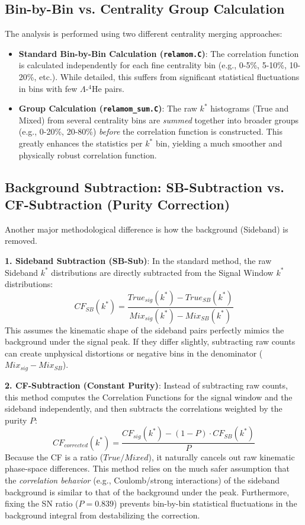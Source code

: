 \documentclass[11pt,a4paper]{article}
\begin{document}
\subsection{Bin-by-Bin vs. Centrality Group Calculation}
The analysis is performed using two different centrality merging approaches:
\begin{itemize}
    \item \textbf{Standard Bin-by-Bin Calculation (\texttt{relamom.C})}: The correlation function is calculated independently for each fine centrality bin (e.g., 0-5\%, 5-10\%, 10-20\%, etc.). While detailed, this suffers from significant statistical fluctuations in bins with few $\Lambda$-$^{4}\mathrm{He}$ pairs.
    \item \textbf{Group Calculation (\texttt{relamom\_sum.C})}: The raw $k^*$ histograms (True and Mixed) from several centrality bins are \textit{summed} together into broader groups (e.g., 0-20\%, 20-80\%) \textit{before} the correlation function is constructed. This greatly enhances the statistics per $k^*$ bin, yielding a much smoother and physically robust correlation function.
\end{itemize}

\subsection{Background Subtraction: SB-Subtraction vs. CF-Subtraction (Purity Correction)}
Another major methodological difference is how the background (Sideband) is removed.

\textbf{1. Sideband Subtraction (SB-Sub)}:
In the standard method, the raw Sideband $k^*$ distributions are directly subtracted from the Signal Window $k^*$ distributions:
\begin{equation}
    CF_{SB}(k^*) = \frac{True_{sig}(k^*) - True_{SB}(k^*)}{Mix_{sig}(k^*) - Mix_{SB}(k^*)}
\end{equation}
This assumes the kinematic shape of the sideband pairs perfectly mimics the background under the signal peak. If they differ slightly, subtracting raw counts can create unphysical distortions or negative bins in the denominator ($Mix_{sig} - Mix_{SB}$).

\textbf{2. CF-Subtraction (Constant Purity)}:
Instead of subtracting raw counts, this method computes the Correlation Functions for the signal window and the sideband independently, and then subtracts the correlations weighted by the purity $P$:
\begin{equation}
    CF_{corrected}(k^*) = \frac{CF_{sig}(k^*) - (1-P) \cdot CF_{SB}(k^*)}{P}
\end{equation}
Because the CF is a ratio ($True/Mixed$), it naturally cancels out raw kinematic phase-space differences. This method relies on the much safer assumption that the \textit{correlation behavior} (e.g., Coulomb/strong interactions) of the sideband background is similar to that of the background under the peak. Furthermore, fixing the SN ratio ($P=0.839$) prevents bin-by-bin statistical fluctuations in the background integral from destabilizing the correction.
\end{document}
